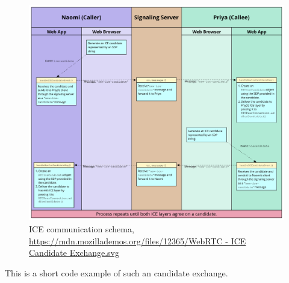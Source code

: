 \begin{figure}[H]
	\hspace*{-3cm}
	\includegraphics[width=1.4\textwidth,height=0.99\textwidth]{images/ICECandidateExchange.pdf}
	\caption{ICE communication schema, \url{https://mdn.mozillademos.org/files/12365/WebRTC - ICE Candidate Exchange.svg}}
	\label{fig:ICE Candidate Exchange}
\end{figure}

\clearpage
This is a short code example of such an  candidate exchange.

